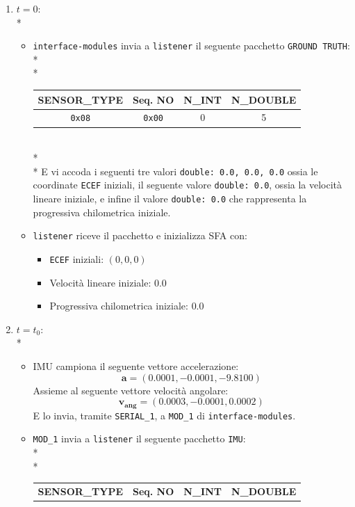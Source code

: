 \begin{enumerate}
	\item $t = 0$:\\*
	\begin{itemize}
	\item \texttt{interface-modules} invia a \texttt{listener} il seguente pacchetto \texttt{GROUND TRUTH}:\\*\\*
	\begin{tabular}{|c|c|c|c|}
		\hline 
		\textbf{SENSOR\_TYPE} & \textbf{Seq. NO} & \textbf{N\_INT} & \textbf{N\_DOUBLE} \\ 
		\hline 
		\texttt{0x08} & \texttt{0x00} & 0 & 5 \\ 
		\hline 
	\end{tabular}\\*\\*
	E vi accoda i seguenti tre valori \texttt{double: 0.0, 0.0, 0.0} ossia le coordinate \texttt{ECEF} iniziali, il seguente valore \texttt{double: 0.0}, ossia la velocit\`a lineare iniziale, e infine il valore \texttt{double: 0.0} che rappresenta la progressiva chilometrica iniziale.
	\item \texttt{listener} riceve il pacchetto e inizializza SFA con:
	\begin{itemize}
		\item \texttt{ECEF} iniziali: $(0, 0, 0)$
		\item Velocit\`a lineare iniziale: $0.0$
		\item Progressiva chilometrica iniziale: $0.0$
	\end{itemize}
	\end{itemize}
	\item $t=t_0$:\\*
	\begin{itemize}
	\item IMU campiona il seguente vettore accelerazione:
	$$
	\mathbf{a} = (0.0001, -0.0001, -9.8100)
	$$
	Assieme al seguente vettore velocit\`a angolare:
	$$
	\mathbf{v_{ang}} = (0.0003, -0.0001, 0.0002)
	$$
	E lo invia, tramite \texttt{SERIAL\_1}, a \texttt{MOD\_1} di \texttt{interface-modules}.
	\item \texttt{MOD\_1} invia a \texttt{listener} il seguente pacchetto \texttt{IMU}:\\*\\*
		\begin{tabular}{|c|c|c|c|}
		\hline 
		\textbf{SENSOR\_TYPE} & \textbf{Seq. NO} & \textbf{N\_INT} & \textbf{N\_DOUBLE} \\ 

\end{tabular}
\end{itemize}
\end{enumerate}
